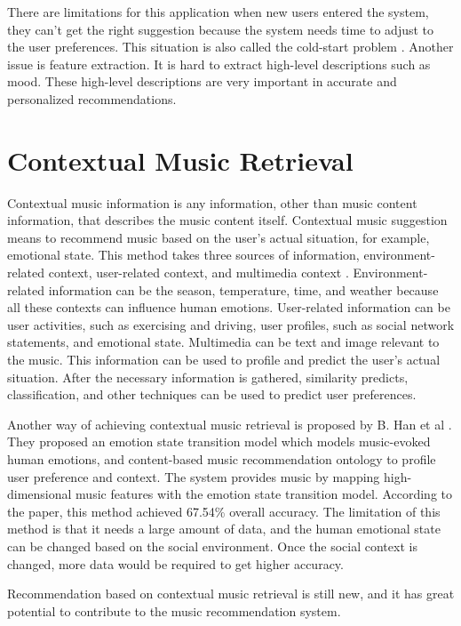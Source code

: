 There are limitations for this application when new users entered the system, they can't get the right suggestion because the system needs time to adjust to the user preferences. This situation is also called the cold-start problem \cite{Celma2010}. Another issue is feature extraction. It is hard to extract high-level descriptions such as mood. These high-level descriptions are very important in accurate and personalized recommendations.

\section{Contextual Music Retrieval}

Contextual music information is any information, other than music content information, that describes the music content itself. Contextual music suggestion means to recommend music based on the user's actual situation, for example, emotional state. This method takes three sources of information, environment-related context, user-related context, and multimedia context \cite{Kaminskas2012}. Environment-related information can be the season, temperature, time, and weather because all these contexts can influence human emotions. User-related information can be user activities, such as exercising and driving, user profiles, such as social network statements, and emotional state. Multimedia can be text and image relevant to the music. This information can be used to profile and predict the user's actual situation. After the necessary information is gathered, similarity predicts, classification, and other techniques can be used to predict user preferences.

Another way of achieving contextual music retrieval is proposed by B. Han et al \cite{Han2010}. They proposed an emotion state transition model which models music-evoked human emotions, and content-based music recommendation ontology to profile user preference and context. The system provides music by mapping high-dimensional music features with the emotion state transition model. According to the paper, this method achieved 67.54\% overall accuracy. The limitation of this method is that it needs a large amount of data, and the human emotional state can be changed based on the social environment. Once the social context is changed, more data would be required to get higher accuracy.

Recommendation based on contextual music retrieval is still new, and it has great potential to contribute to the music recommendation system.
